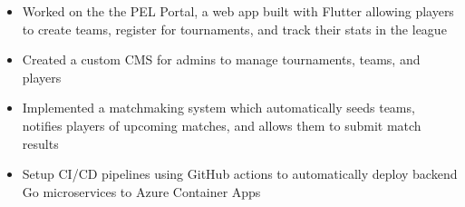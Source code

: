 \documentclass[9pt]{developercv} %
\begin{document}
\begin{entrylist}
{\begin{itemize}[noitemsep,topsep=0pt,parsep=0pt,partopsep=0pt, leftmargin=10pt]
            \item Worked on the the PEL Portal, a web app built with Flutter allowing players to create teams, register for tournaments, and track their stats in the league
            \item Created a custom CMS for admins to manage tournaments, teams, and players
            \item Implemented a matchmaking system which automatically seeds teams, notifies players of upcoming matches, and allows them to submit match results
            \item Setup CI/CD pipelines using GitHub actions to automatically deploy backend Go microservices to Azure Container Apps
        \end{itemize}}
\end{entrylist}
\vspace{-10pt}
\end{document}
